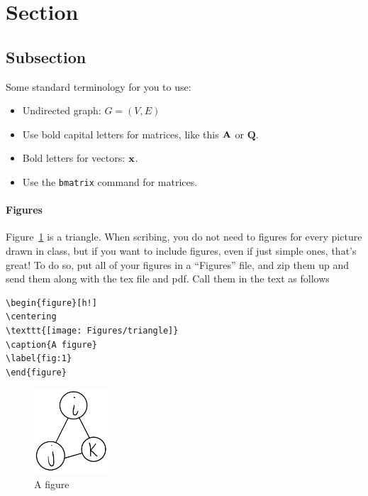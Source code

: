 \documentclass[11  pt]{article}
\begin{document}

\section{Section}


\subsection{Subsection}

Some standard terminology for you to use:
\begin{itemize}
\item Undirected graph: $G = (V,E)$
\item  Use bold capital letters for matrices, like this $\textbf{A}$ or $\textbf{Q}$. 
\item Bold letters for vectors: $\textbf{x}$. 
\item Use the \verb|bmatrix| command for matrices.
\end{itemize}

\paragraph{Figures}
Figure~\ref{fig:1} is a triangle. When scribing, you do not need to figures for every picture drawn in class, but if you want to include figures, even if just simple ones, that's great! To do so, put all of your figures in a ``Figures'' file, and zip them up and send them along with the tex file and pdf. 
Call them in the text as follows

\begin{verbatim}
\begin{figure}[h!]
\centering
\texttt{[image: Figures/triangle]}
\caption{A figure}
\label{fig:1}
\end{figure}
\end{verbatim}


\begin{figure}[h!]
	\centering
	\includegraphics[width=0.25\textwidth]{triangle}
	\caption{A figure}
	\label{fig:1}
\end{figure}
\end{document}
